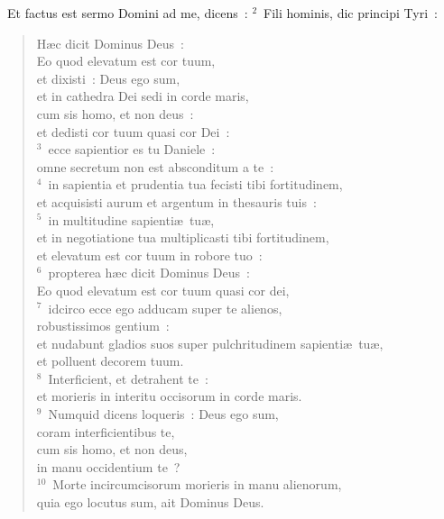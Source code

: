 ~Et factus est sermo Domini ad me, dicens~:
${}^{2}$~Fili hominis, dic principi Tyri~: \begin{flushleft}\begin{verse}H\ae c dicit Dominus Deus~:\\ Eo quod elevatum est cor tuum,\\ et dixisti~: Deus ego sum,\\ et in cathedra Dei sedi in corde maris,\\ cum sis homo, et non deus~:\\ et dedisti cor tuum quasi cor Dei~:\\
${}^{3}$~ecce sapientior es tu Daniele~:\\ omne secretum non est absconditum a te~:\\
${}^{4}$~in sapientia et prudentia tua fecisti tibi fortitudinem,\\ et acquisisti aurum et argentum in thesauris tuis~:\\
${}^{5}$~in multitudine sapienti\ae\ tu\ae ,\\ et in negotiatione tua multiplicasti tibi fortitudinem,\\ et elevatum est cor tuum in robore tuo~:\\
${}^{6}$~propterea h\ae c dicit Dominus Deus~:\\ Eo quod elevatum est cor tuum quasi cor dei,\\
${}^{7}$~idcirco ecce ego adducam super te alienos,\\ robustissimos gentium~:\\ et nudabunt gladios suos super pulchritudinem sapienti\ae\ tu\ae ,\\ et polluent decorem tuum.\\
${}^{8}$~Interficient, et detrahent te~:\\ et morieris in interitu occisorum in corde maris.\\
${}^{9}$~Numquid dicens loqueris~: Deus ego sum,\\ coram interficientibus te,\\ cum sis homo, et non deus,\\ in manu occidentium te~?\\
${}^{10}$~Morte incircumcisorum morieris in manu alienorum,\\ quia ego locutus sum, ait Dominus Deus.\end{verse}\end{flushleft}



